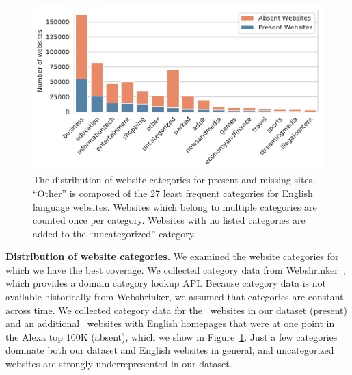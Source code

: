 \begin{figure}[t]
\centering
\includegraphics[width=1\columnwidth]{chapters/privacypolicies/figures/category_dist.pdf}

\caption[Distribution of website categories]{The distribution of website categories for present and missing sites. ``Other'' is composed of the 27 least frequent categories for English language websites. Websites which belong to multiple categories are counted once per category. Websites with no listed categories are added to the ``uncategorized'' category.}
\label{fig:cat_dist}
\end{figure}

{\textbf{Distribution of website categories.}}
We examined the website categories for which we have the best coverage. We collected category data from Webshrinker~\cite{Webshrinker}, which provides a domain category lookup API.
Because category data is not available historically from Webshrinker, we assumed that categories are constant across time. We collected category data for the \numpresentdoms~websites in our dataset (present) and an additional \numabsentenglishdoms~websites with English homepages that were at one point in the Alexa top 100K (absent), which we show in Figure~\ref{fig:cat_dist}.
Just a few categories dominate both our dataset and English websites in general, and uncategorized websites are strongly underrepresented in our dataset.

